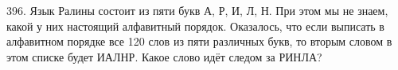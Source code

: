 396. Язык Ралины состоит из пяти букв А, Р, И, Л, Н. При этом мы не знаем, какой у них настоящий алфавитный порядок. Оказалось, что если выписать в алфавитном порядке все 120 слов из пяти различных букв, то вторым словом в этом списке будет ИАЛНР. Какое слово идёт следом за РИНЛА?
